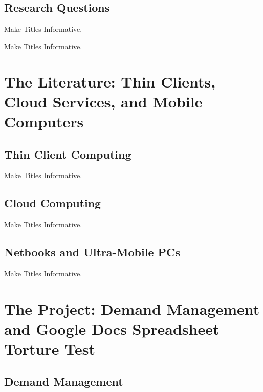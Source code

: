 \documentclass{beamer}
\begin{document}
\subsection{Research Questions}

\begin{frame}{Make Titles Informative.}
\end{frame}

\begin{frame}{Make Titles Informative.}
\end{frame}

\section[Literature Review]{The Literature: Thin Clients, Cloud Services, and Mobile Computers}

\subsection{Thin Client Computing}

\begin{frame}{Make Titles Informative.}
\end{frame}

\subsection{Cloud Computing}

\begin{frame}{Make Titles Informative.}
\end{frame}

\subsection{Netbooks and Ultra-Mobile PCs}

\begin{frame}{Make Titles Informative.}
\end{frame}

\section[Research Project]{The Project: Demand Management and Google Docs Spreadsheet Torture Test}

\subsection{Demand Management}
\end{document}
